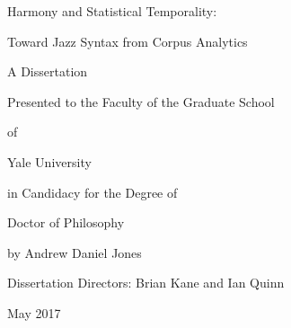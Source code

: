 \documentclass[12pt,titlepage]{report}
\begin{document}

\newpage

\titlepage

\vspace{1in}

\centerline{ \large Harmony and Statistical Temporality:}

\centerline{ \large Toward Jazz Syntax from Corpus Analytics}

\vspace{3.5in}

{\centering
{}
A Dissertation

Presented to the Faculty of the Graduate School

of

Yale University

in Candidacy for the Degree of

Doctor of Philosophy

\vspace{1.5in}

by
Andrew Daniel Jones

\vspace{0.5in}

Dissertation Directors: Brian Kane and Ian Quinn

\vspace{0.5in}

May 2017

}
\setcounter{page}{1}
\tableofcontents
\newpage
\listoffigures
\newpage
\setcounter{page}{1}


\end{document}
